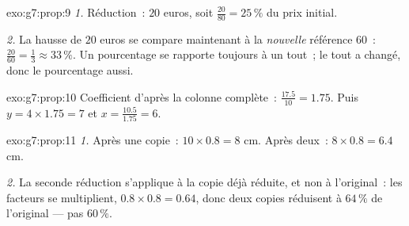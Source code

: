 \begin{solution}{exo:g7:prop:9}
\emph{1.} Réduction~: $20$ euros, soit $\frac{20}{80} = 25\,\%$ du
prix initial.

\emph{2.} La hausse de $20$ euros se compare maintenant à la
\emph{nouvelle} référence $60$~: $\frac{20}{60} = \frac13 \approx
33\,\%$. Un pourcentage se rapporte toujours à un tout~; le tout a
changé, donc le pourcentage aussi.
\end{solution}

\begin{solution}{exo:g7:prop:10}
Coefficient d'après la colonne complète~: $\frac{17.5}{10} = 1.75$.
Puis $y = 4 \times 1.75 = 7$ et $x = \frac{10.5}{1.75} = 6$.
\end{solution}

\begin{solution}{exo:g7:prop:11}
\emph{1.} Après une copie~: $10 \times 0.8 = 8$ cm. Après deux~:
$8 \times 0.8 = 6.4$ cm.

\emph{2.} La seconde réduction s'applique à la copie déjà réduite, et
non à l'original~: les facteurs se multiplient,
$0.8 \times 0.8 = 0.64$, donc deux copies réduisent à $64\,\%$ de
l'original --- pas $60\,\%$.
\end{solution}


